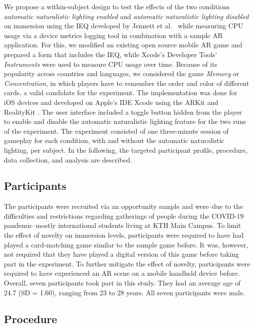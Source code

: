 \documentclass[12pt,twoside,english]{article}
\begin{document}
We propose a within-subject design to test the effects of the two conditions \textit{automatic naturalistic lighting enabled} and \textit{automatic naturalistic lighting disabled} on immersion using the \gls{IEQ} developed by Jennett et al.~\cite{jennett_measuring_2008} while measuring \gls{CPU} usage via a device metrics logging tool in combination with a sample \gls{AR} application.
For this, we modified an existing open source mobile \gls{AR} game and prepared a form that includes the \gls{IEQ}, while Xcode's Developer Tools' \textit{Instruments} were used to measure \gls{CPU} usage over time.
Because of its popularity across countries and languages, we considered the game \textit{Memory} or \textit{Concentration}, in which players have to remember the order and color of different cards, a valid candidate for the experiment.
The implementation was done for iOS devices and developed on Apple's \gls{IDE} Xcode using the ARKit and RealityKit .
The user interface included a toggle button hidden from the player to enable and disable the automatic naturalistic lighting feature for the two runs of the experiment.
The experiment consisted of one three-minute session of gameplay for each condition, with and without the automatic naturalistic lighting, per subject.
In the following, the targeted participant profile, procedure, data collection, and analysis are described.

\subsection{Participants}
\label{sect:participants}

The participants were recruited via an opportunity sample and were--due to the difficulties and restrictions regarding gatherings of people during the COVID-19 pandemic--mostly international students living at KTH Main Campus.
To limit the effect of novelty on immersion levels, participants were required to have had played a card-matching game similar to the sample game before.
It was, however, not required that they have played a digital version of this game before taking part in the experiment.
To further mitigate the effect of novelty, participants were required to have experienced an \gls{AR} scene on a mobile handheld device before.
Overall, seven participants took part in this study.
They had an average age of 24.7 (SD = 1.60), ranging from 23 to 28 years.
All seven participants were male.

\subsection{Procedure}
\label{sect:procedure}
\end{document}
